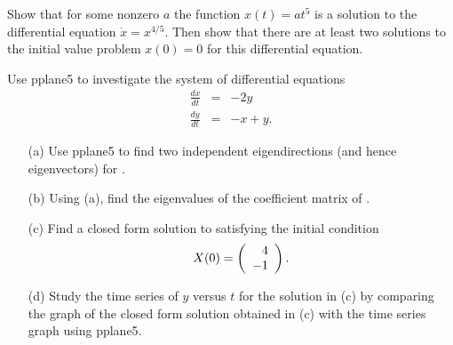 \documentclass{ximera}
\begin{document}
\begin{exercise}  \label{c6.1.4A}
Show that for some nonzero $a$ the function $x(t)=at^5$ is a solution to the
differential equation $\dot{x}=x^{4/5}$.  Then show that there are at least
two solutions to the initial value problem $x(0)=0$ for this differential
equation.
\end{exercise}


\CEXER

\begin{exercise} \label{c6.1.4}
Use {\sf pplane5} to investigate the system
of differential equations
\begin{equation}  \label{Ex.1.4}
\begin{array}{rcr}
\frac{dx}{dt}  & = & -2y \\
\frac{dy}{dt}  & = &  -x+y.
\end{array}
\end{equation}
\begin{itemize}
\item[(a)] Use {\sf pplane5} to find two independent eigendirections (and
hence eigenvectors) for .
\item[(b)] Using (a), find the eigenvalues of the coefficient matrix of
.
\item[(c)] Find a closed form solution to  satisfying the initial
condition
\[
X(0) = \left(\begin{array}{r} 4 \\ -1\end{array}\right).
\]
\item[(d)] Study the time series of $y$ versus $t$ for the solution in (c)
by comparing the graph of the closed form solution obtained in (c) with the
time series graph using {\sf pplane5}.
\end{itemize}
\end{exercise}
\end{document}
